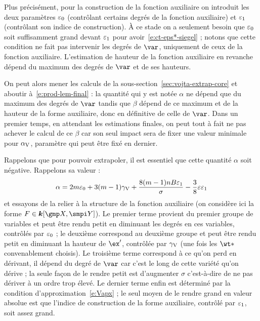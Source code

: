 Plus précisément, pour la construction de la fonction auxiliaire on introduit
les deux paramètres \( \varepsilon\sb0 \) (contrôlant certains degrés de la fonction
auxiliaire) et \( \varepsilon\sb1 \) (contrôlant son indice de construction). À ce
stade on a seulement besoin que \( \varepsilon\sb0 \) soit suffisamment grand devant \(
  \varepsilon\sb1 \) pour avoir~\eqref{e:ct-eps*-siegel} ; notons que cette condition ne
fait pas intervenir les degrés de \( \var \), uniquement de ceux de la
fonction auxiliaire. L'estimation de hauteur de la fonction auxiliaire en
revanche dépend du maximum des degrés de \( \var \) et de ses hauteurs.

On peut alors mener les calculs de la sous-section~\ref{sec:vojta-extrap-core}
et aboutir à~\eqref{e:prod-lem-final} : la quantité qui y est notée \(
  \alpha \) ne dépend que du maximum des degrés de \( \var \) tandis que \(
  \beta \) dépend de ce maximum et de la hauteur de la forme auxiliaire, donc
en définitive de celle de \( \var \). Dans un premier temps, en attendant les
estimations finales, on peut tout à fait ne pas achever le calcul de ce \(
  \beta \) car son seul impact sera de fixer une valeur minimale pour \( \alpha \sb{\mathrm{V}}
\), paramètre qui peut être fixé en dernier.

Rappelons que pour pouvoir extrapoler, il est essentiel que cette
quantité \( \alpha \) soit négative. Rappelons sa valeur :
\begin{equation}
  \alpha
  =
  2 m \varepsilon\sb0
  + 3 (m - 1) \gamma \sb{\mathrm{V}}
  + \frac{8 (m - 1) n B \varepsilon\sb1}{\sigma}
  - \frac38 \varepsilon \varepsilon\sb1
\end{equation}
et essayons de la relier à la structure de la fonction auxiliaire (on
considère ici la forme \( F \in \cdn[\vmp, \vmpi] \)). Le premier terme
provient du premier groupe de variables et peut être rendu petit en
diminuant les degrés en ces variables, contrôlés par \( \varepsilon\sb0 \) ; le deuxième
correspond au deuxième groupe et peut être rendu petit en diminuant la hauteur
de \( \ex' \), contrôlée par \( \gamma \sb{\mathrm{V}} \) (une fois les \( \wt* \)
convenablement choisis). Le troisième terme correspond à ce qu'on perd en
dérivant, il dépend du degré de \( \var \) car c'est le long de cette variété
qu'on dérive ; la seule façon de le rendre petit est d'augmenter \( \sigma \)
c'est-à-dire de ne pas dériver à un ordre trop élevé. Le dernier terme enfin
est déterminé par la condition d'approximation~\eqref{e:Vapx} ; le seul moyen
de le rendre grand en valeur absolue est que l'indice de construction de la
forme auxiliaire, contrôlé par \( \varepsilon\sb1 \), soit assez grand.

